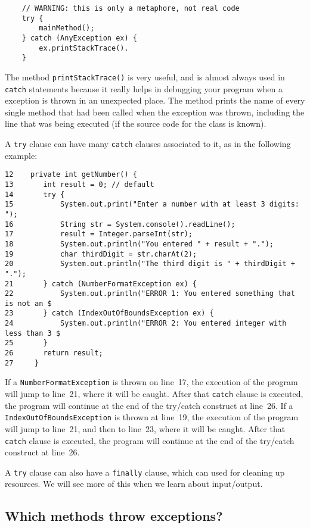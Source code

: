 \begin{verbatim}
    // WARNING: this is only a metaphore, not real code
    try {
        mainMethod();
    } catch (AnyException ex) {
        ex.printStackTrace().
    }
\end{verbatim}

The method \verb+printStackTrace()+ is very useful, and is almost
always used in \verb+catch+ statements because it really helps in
debugging your program when a exception is thrown in an unexpected
place. The method prints the name of every single method that had been
called when the exception was thrown, including the line that was
being executed (if the source code for the class is known). 

A \verb+try+ clause can have many \verb+catch+ clauses associated to
it, as in the following example: 

\begin{verbatim}
12    private int getNumber() {
13       int result = 0; // default
14       try {
15           System.out.print("Enter a number with at least 3 digits: ");
16           String str = System.console().readLine();
17           result = Integer.parseInt(str);
18           System.out.println("You entered " + result + ".");
19           char thirdDigit = str.charAt(2);
20           System.out.println("The third digit is " + thirdDigit + ".");
21       } catch (NumberFormatException ex) {
22           System.out.println("ERROR 1: You entered something that is not an $
23       } catch (IndexOutOfBoundsException ex) {
24           System.out.println("ERROR 2: You entered integer with less than 3 $
25       }
26       return result;
27     }
\end{verbatim}

If a \verb+NumberFormatException+ is thrown on line~17, the execution
of the program will jump to line~21, where it will be caught. After
that \verb+catch+ clause is executed, the program will continue at the
end of the try/catch construct at line~26. If a
\verb+IndexOutOfBoundsException+ is thrown at line~19, the execution
of the program will jump to line~21, and then to line~23, where it
will be caught. After that \verb+catch+ clause is executed, the
program will continue at the end of the try/catch construct at line~26.  

A \verb+try+ clause can also have a \verb+finally+ clause, which can
used for cleaning up resources. We will see more of this when we learn
about input/output. 

\subsection{Which methods throw exceptions?}
\label{sec:which-methods-throw}



